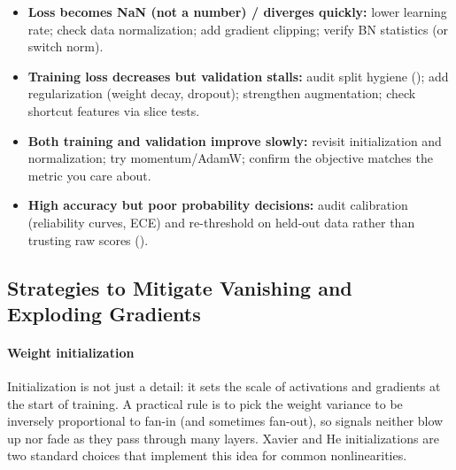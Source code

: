\begin{tcolorbox}[summarybox, title={Training failure signatures (symptom $\rightarrow$ likely fixes)}]
\begin{itemize}
    \item \textbf{Loss becomes NaN (not a number) / diverges quickly:} lower learning rate; check data normalization; add gradient clipping; verify BN statistics (or switch norm).
    \item \textbf{Training loss decreases but validation stalls:} audit split hygiene (); add regularization (weight decay, dropout); strengthen augmentation; check shortcut features via slice tests.
    \item \textbf{Both training and validation improve slowly:} revisit initialization and normalization; try momentum/AdamW; confirm the objective matches the metric you care about.
    \item \textbf{High accuracy but poor probability decisions:} audit calibration (reliability curves, ECE) and re-threshold on held-out data rather than trusting raw scores ().
\end{itemize}
\end{tcolorbox}

\subsection{Strategies to Mitigate Vanishing and Exploding Gradients}
\label{sec:cnn_strategies_to_mitigate_vanishing_and_exploding_gradients}

\paragraph{Weight initialization}

Initialization is not just a detail: it sets the scale of activations and gradients at the start of training. A practical rule is to pick the weight variance to be inversely proportional to fan\hyp{}in (and sometimes fan\hyp{}out), so signals neither blow up nor fade as they pass through many layers. Xavier and He initializations are two standard choices that implement this idea for common nonlinearities.

